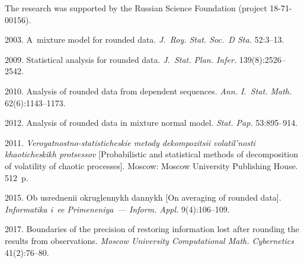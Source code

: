 




\Ack
\noindent
The research was supported by the Russian Science Foundation (project 18-71-00156).




  \begin{multicols}{2}

\renewcommand{\bibname}{\protect\rmfamily References}

{\small\frenchspacing
 {%
 \begin{thebibliography}{99}
 2003.
A~mixture model for rounded data.  \textit{J.~Roy. Stat. Soc.~D Sta.} 52:3--13.

 2009. 
Statistical analysis for rounded data. \textit{J.~Stat. Plan. 
Infer.} 139(8):2526--2542.

 2010. 
Analysis of rounded data from dependent sequences. 
\textit{Ann. I.~Stat. Math.} 62(6):1143--1173.

 2012. Analysis of rounded data in mixture normal model. 
\textit{Stat. Pap.} 53:895--914.

 2011. 
\textit{Veroyatnostno-statisticheskie metody dekompozitsii volatil'nosti 
khaoticheskikh protsessov} [Probabilistic and statistical methods of 
decomposition of volatility of chaotic processes]. 
Moscow: Moscow University Publishing House. 512~p.

2015. Ob usrednenii okruglennykh dannykh [On averaging of rounded data].
\textit{Informatika i~ee Primeneniya~--- Inform. Appl.} 9(4):106--109.

 2017. 
Boundaries of the precision of restoring information lost after rounding
 the results from observations. 
 \textit{Moscow University Computational Math. Cybernetics} 41(2):76--80.


\end{thebibliography}}}
\end{multicols}
